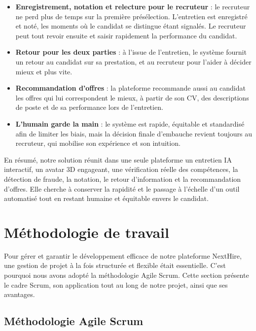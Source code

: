\begin{itemize}
  \item \textbf{Enregistrement, notation et relecture pour le recruteur} : le recruteur ne perd plus de temps sur la première présélection. L’entretien est enregistré et noté, les moments où le candidat se distingue étant signalés. Le recruteur peut tout revoir ensuite et saisir rapidement la performance du candidat.

  \item \textbf{Retour pour les deux parties} : à l’issue de l’entretien, le système fournit un retour au candidat sur sa prestation, et au recruteur pour l’aider à décider mieux et plus vite.

  \item \textbf{Recommandation d’offres} : la plateforme recommande aussi au candidat les offres qui lui correspondent le mieux, à partir de son CV, des descriptions de poste et de sa performance lors de l’entretien.

  \item \textbf{L’humain garde la main} : le système est rapide, équitable et standardisé afin de limiter les biais, mais la décision finale d’embauche revient toujours au recruteur, qui mobilise son expérience et son intuition.
\end{itemize}

En résumé, notre solution réunit dans une seule plateforme un entretien IA interactif, un avatar 3D engageant, une vérification réelle des compétences, la détection de fraude, la notation, le retour d’information et la recommandation d’offres. Elle cherche à conserver la rapidité et le passage à l’échelle d’un outil automatisé tout en restant humaine et équitable envers le candidat.

\section{Méthodologie de travail}

Pour gérer et garantir le développement efficace de notre plateforme NextHire, une gestion de projet à la fois structurée et flexible était essentielle. C’est pourquoi nous avons adopté la méthodologie Agile Scrum. Cette section présente le cadre Scrum, son application tout au long de notre projet, ainsi que ses avantages.

\subsection{Méthodologie Agile Scrum}

